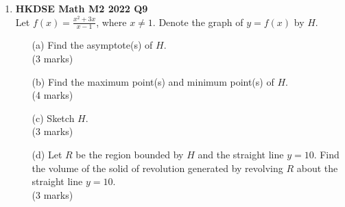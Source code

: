 \documentclass{report}
\begin{document}
\begin{enumerate}
	\item \textbf{HKDSE Math M2 2022 Q9}\\
	Let $\displaystyle f(x) = \frac{x^2 +3x}{x-1}$, where $x \neq 1$. Denote the graph of $y = f(x)$ by $H$.
	\begin{enumerate}
		\item [(a)] Find the asymptote(s) of $H$. \\(3 marks)
		\item [(b)] Find the maximum point(s) and minimum point(s) of $H$. \\(4 marks)
		\item [(c)] Sketch $H$. \\(3 marks)
		\item [(d)] Let $R$ be the region bounded by $H$ and the straight line $y = 10$. Find the volume of the solid of revolution generated by revolving $R$ about the straight line $y = 10$. \\(3 marks)
	\end{enumerate}


\end{enumerate}
\end{document}
